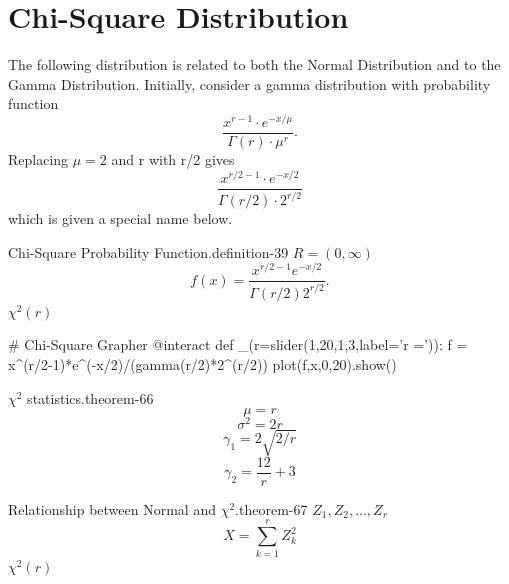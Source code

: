 \documentclass[10pt,]{book}
\numberwithin{equation}{section}
\begin{document}
\section[{Chi-Square Distribution}]{Chi-Square Distribution}\label{section-59}
\hypertarget{p-1045}{}%
The following distribution is related to both the Normal Distribution and to the Gamma Distribution. Initially, consider a gamma distribution with probability function%
\begin{equation*}
\frac{x^{r-1} \cdot e^{-x / \mu}}{\Gamma(r) \cdot \mu^r}.
\end{equation*}
Replacing \(\mu = 2\) and r with r/2 gives%
\begin{equation*}
\frac{x^{r/2-1} \cdot e^{-x/2}}{\Gamma(r/2) \cdot 2^{r/2}}
\end{equation*}
which is given a special name below.%
\par
\hypertarget{p-1046}{}%
\begin{definition}{Chi-Square Probability Function.}{definition-39}%
\(R = (0,\infty)\)%
\begin{equation*}
f(x) = \frac{x^{r/2-1} e^{-x/2} }{\Gamma(r/2) 2^{r/2}}.
\end{equation*}
\(\chi^2(r)\)\end{definition}
%
\par
\hypertarget{p-1047}{}%
\leavevmode%
\begin{sageinput}
# Chi-Square Grapher
@interact
def _(r=slider(1,20,1,3,label='r =')):
    f = x^(r/2-1)*e^(-x/2)/(gamma(r/2)*2^(r/2))
    plot(f,x,0,20).show()
\end{sageinput}
%
\par
\hypertarget{p-1048}{}%
\begin{theorem}{\(\chi^2\) statistics.}{}{theorem-66}%
%
\begin{equation*}
\mu = r
\end{equation*}
%
\begin{equation*}
\sigma^2 = 2r
\end{equation*}
%
\begin{equation*}
\gamma_1 = 2 \sqrt{2/r}
\end{equation*}
%
\begin{equation*}
\gamma_2 = \frac{12}{r} + 3
\end{equation*}
\end{theorem}
%
\par
\hypertarget{p-1049}{}%
\begin{theorem}{Relationship between Normal and \(\chi^2\).}{}{theorem-67}%
\(Z_1, Z_2, ..., Z_r\)%
\begin{equation*}
X = \sum_{k=1}^r Z_k^2
\end{equation*}
\(\chi^2(r)\)\end{theorem}
\end{document}
